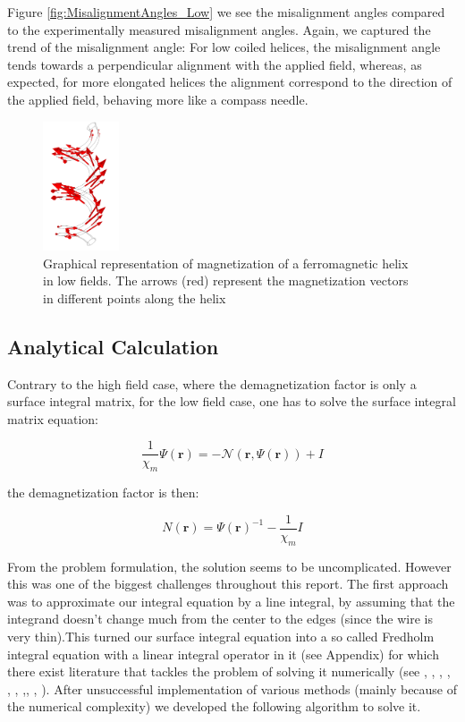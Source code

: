 Figure \ref{fig:MisalignmentAngles_Low} we see the misalignment angles compared to the experimentally measured misalignment angles. Again, we captured the trend of the misalignment angle: For low coiled helices, the misalignment angle tends towards a perpendicular alignment with the applied field, whereas, as expected, for more elongated helices the alignment correspond to the direction of the applied field, behaving more like a compass needle.\\

\begin{figure}[ht]
	\centering
  \includegraphics[width=0.2\textwidth]{Pictures/MagnetLow.png}
	\caption{Graphical representation of magnetization of a ferromagnetic helix in low fields. The arrows (red) represent the magnetization vectors in different points along the helix}
	\label{fig:MagnetLow}
\end{figure}


\subsection{Analytical Calculation}

Contrary to the high field case, where the demagnetization factor is only a surface integral matrix, for the low field case, one has to solve the surface integral matrix equation:

\begin{equation}
\frac{1}{\chi_m}\Psi(\textbf{r}) = -\mathcal{N}(\textbf{r},\Psi(\textbf{r}))  + I
\end{equation}

the demagnetization factor is then:

\begin{equation}
N(\textbf{r}) = \Psi(\textbf{r})^{-1} - \frac{1}{\chi_m}I
\end{equation}

From the problem formulation, the solution seems to be uncomplicated. However this was one of the biggest challenges throughout this report. The first approach was to approximate our integral equation by a line integral, by assuming that the integrand doesn't change much from the center to the edges (since the wire is very thin).This turned our surface integral equation into a so called Fredholm integral equation with a linear integral operator in it (see Appendix) for which there exist literature that tackles the problem of solving it numerically (see  \cite{Allahviranloo2011}, \cite{Babolian2004}, \cite{DeBonis2008}, \cite{Hameed2011}, \cite{Jafarian2012}, \cite{Karimi2015}, \cite{Maleknejad2005},\cite{Rashidinia2007}, \cite{Ray2013}, \cite{Saeed2008}). After unsuccessful implementation of various methods (mainly because of the numerical complexity) we developed the following algorithm to solve it.

